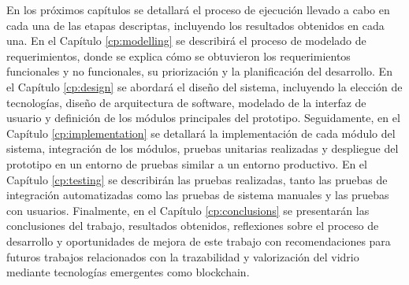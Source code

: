 En los próximos capítulos se detallará el proceso de ejecución llevado a cabo en cada una de las etapas descriptas, incluyendo los resultados obtenidos en cada una.
En el Capítulo \ref{cp:modelling} se describirá el proceso de modelado de requerimientos, donde se explica cómo se obtuvieron los requerimientos funcionales y no funcionales, su priorización y la planificación del desarrollo.
En el Capítulo \ref{cp:design} se abordará el diseño del sistema, incluyendo la elección de tecnologías, diseño de arquitectura de software, modelado de la interfaz de usuario y definición de los módulos principales del prototipo.
Seguidamente, en el Capítulo \ref{cp:implementation} se detallará la implementación de cada módulo del sistema, integración de los módulos, pruebas unitarias realizadas y despliegue del prototipo en un entorno de pruebas similar a un entorno productivo.
En el Capítulo \ref{cp:testing} se describirán las pruebas realizadas, tanto las pruebas de integración automatizadas como las pruebas de sistema manuales y las pruebas con usuarios.
Finalmente, en el Capítulo \ref{cp:conclusions} se presentarán las conclusiones del trabajo, resultados obtenidos, reflexiones sobre el proceso de desarrollo y oportunidades de mejora de este trabajo con recomendaciones para futuros trabajos relacionados con la trazabilidad y valorización del vidrio mediante tecnologías emergentes como blockchain.
